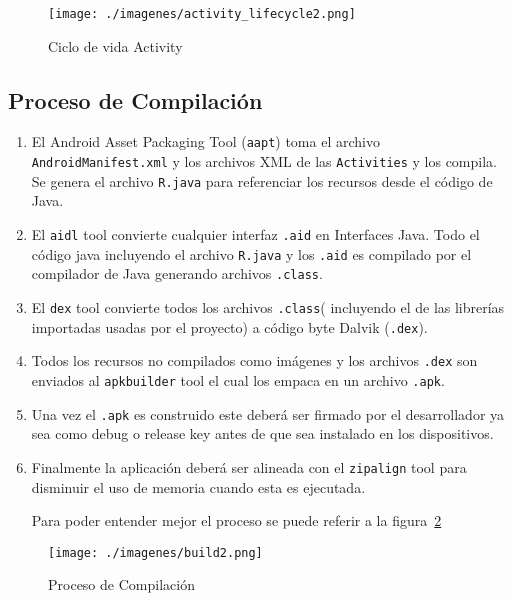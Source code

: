 \documentclass[letterpaper,12pt]{book}
\begin{document}
\begin{mainmatter}
\begin{figure}	
\begin{center}
\texttt{[image: ./imagenes/activity\_lifecycle2.png]}
\end{center}
\caption{Ciclo de vida Activity \cite{andActi}} \label{cap:CiclVid}
\end{figure} 

\subsection{Proceso de Compilación}
\begin{enumerate}
 \item El   Android   Asset   Packaging   Tool   (\texttt{aapt})   toma   el   archivo
\texttt{AndroidManifest.xml}  y  los  archivos  XML  de las  \texttt{Activities}  y  los
compila.  Se  genera el archivo  \texttt{R.java} para referenciar  los recursos
desde el código de Java.

\item El  \texttt{aidl}   tool  convierte  cualquier   interfaz  \texttt{.aid} en  Interfaces
Java. Todo el  código java incluyendo el archivo \texttt{R.java}  y los \texttt{.aid} es
compilado por el compilador de Java generando archivos \texttt{.class}.

\item El \texttt{dex} tool convierte todos  los archivos \texttt{.class}( incluyendo el de las
librerías  importadas usadas  por el  proyecto) a  código  byte Dalvik
(\texttt{.dex}).

\item Todos los recursos no compilados como imágenes y los archivos \texttt{.dex} son
enviados al \texttt{apkbuilder} tool el cual los empaca en un archivo \texttt{.apk}.

\item Una  vez  el  \texttt{.apk}  es  construido  este deberá  ser  firmado  por  el
desarrollador  ya  sea como  debug  o release  key  antes  de que  sea
instalado en los dispositivos.

\item Finalmente la aplicación deberá ser alineada con el \texttt{zipalign} tool para
disminuir el uso de memoria cuando esta es ejecutada.

Para poder entender mejor el proceso se puede referir a la figura~\ref{cap:ProcComp}

\end{enumerate}

 
  \begin{figure}	
  \begin{center}
  \texttt{[image: ./imagenes/build2.png]}
  \end{center}
  \caption{Proceso de Compilación  \cite{Build}} \label{cap:ProcComp}
  \end{figure} 


\end{mainmatter}
\end{document}
